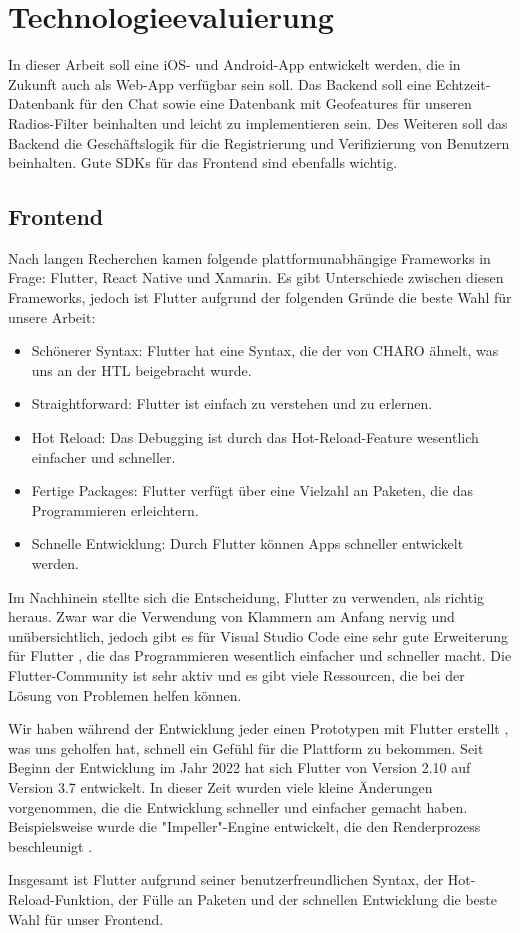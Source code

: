 \section{Technologieevaluierung}

In dieser Arbeit soll eine iOS- und Android-App entwickelt werden, die in Zukunft auch als Web-App verfügbar sein soll. Das Backend soll eine Echtzeit-Datenbank für den Chat sowie eine Datenbank mit Geofeatures für unseren Radios-Filter beinhalten und leicht zu implementieren sein. Des Weiteren soll das Backend die Geschäftslogik für die Registrierung und Verifizierung von Benutzern beinhalten. Gute SDKs für das Frontend sind ebenfalls wichtig.

\subsection{Frontend}

Nach langen Recherchen kamen folgende plattformunabhängige Frameworks in Frage: Flutter, React Native und Xamarin. Es gibt Unterschiede zwischen diesen Frameworks, jedoch ist Flutter aufgrund der folgenden Gründe die beste Wahl für unsere Arbeit:

\begin{itemize}
\item Schönerer Syntax: Flutter hat eine Syntax, die der von CHARO ähnelt, was uns an der HTL beigebracht wurde.
\item Straightforward: Flutter ist einfach zu verstehen und zu erlernen.
\item Hot Reload: Das Debugging ist durch das Hot-Reload-Feature wesentlich einfacher und schneller.
\item Fertige Packages: Flutter verfügt über eine Vielzahl an Paketen, die das Programmieren erleichtern.
\item Schnelle Entwicklung: Durch Flutter können Apps schneller entwickelt werden.
\end{itemize}

Im Nachhinein stellte sich die Entscheidung, Flutter zu verwenden, als richtig heraus. Zwar war die Verwendung von Klammern am Anfang nervig und unübersichtlich, jedoch gibt es für Visual Studio Code eine sehr gute Erweiterung für Flutter \cite{flutter_extension}, die das Programmieren wesentlich einfacher und schneller macht. Die Flutter-Community ist sehr aktiv und es gibt viele Ressourcen, die bei der Lösung von Problemen helfen können.

Wir haben während der Entwicklung jeder einen Prototypen mit Flutter erstellt \cite{flutter_test_repo}, was uns geholfen hat, schnell ein Gefühl für die Plattform zu bekommen. Seit Beginn der Entwicklung im Jahr 2022 hat sich Flutter von Version 2.10 auf Version 3.7 entwickelt. In dieser Zeit wurden viele kleine Änderungen vorgenommen, die die Entwicklung schneller und einfacher gemacht haben. Beispielsweise wurde die "Impeller"-Engine entwickelt, die den Renderprozess beschleunigt \cite{flutter_impeller}.

Insgesamt ist Flutter aufgrund seiner benutzerfreundlichen Syntax, der Hot-Reload-Funktion, der Fülle an Paketen und der schnellen Entwicklung die beste Wahl für unser Frontend.




